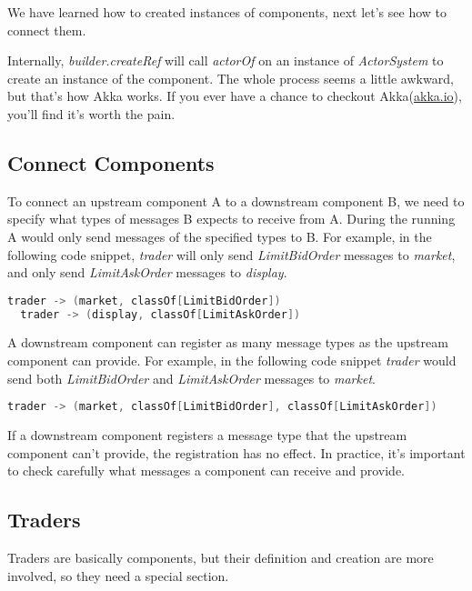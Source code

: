 We have learned how to created instances of components, next let's see how to connect them.

\begin{info}
Internally, \emph{builder.createRef} will call \emph{actorOf} on an instance of \emph{ActorSystem} to create an instance of the component. The whole process seems a little awkward, but that's how Akka works. If you ever have a chance to checkout Akka(\href{http://akka.io}{akka.io}), you'll find it's worth the pain.
\end{info}

\subsection{Connect Components}

To connect an upstream component A to a downstream component B, we need to specify what types of messages B expects to receive from A. During the running A would only send messages of the specified types to B. For example, in the following code snippet, \emph{trader} will only send \emph{LimitBidOrder} messages to \emph{market}, and only send \emph{LimitAskOrder} messages to \emph{display}.

\begin{lstlisting}[language=Scala]
  trader -> (market, classOf[LimitBidOrder])
  trader -> (display, classOf[LimitAskOrder])
\end{lstlisting}

A downstream component can register as many message types as the upstream component can provide. For example, in the following code snippet \emph{trader} would send both \emph{LimitBidOrder} and \emph{LimitAskOrder} messages to \emph{market}.

\begin{lstlisting}[language=Scala]
  trader -> (market, classOf[LimitBidOrder], classOf[LimitAskOrder])
\end{lstlisting}

If a downstream component registers a message type that the upstream component can't provide, the registration has no effect. In practice, it's important to check carefully what messages a component can receive and provide.

\subsection{Traders}

Traders are basically components, but their definition and creation are more involved, so they need a special section.

